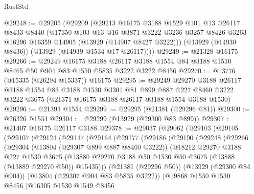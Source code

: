 \begin{lexlean}{RustStd}
\begin{coremodule}
@29248 := @29205
    (@29209
      (@29213
        @16175
        @3188
        @1529
        @101
        @13
        @26117
        @8433
        @8440
        (@17350
          @103
          @13
          @16
          @3871
          @3222
          @3236
          @3257
          @8426
          @3263
          @16296
          @16359
          @14905
          (@13929 (@14907 @8427 @3222)))
        (@13929 (@14930 @8436))
        (@13929 (@14939 @1534 @17 @26117))))
@29249 := @21328 @16175
@29266 := @29249
    @16175
    @3188
    @26117
    @3188
    @1554
    @84
    @3188
    @1530
    @8465
    @50
    @904
    @83
    @1550
    @5835
    @3222
    @3222
    @8456
@29270 := @13776 (@15335 (@26294 @15337)) @16175
@29295 := @29249
    @29270
    @3188
    @26117
    @3188
    @1554
    @83
    @3188
    @1530
    @3301
    @81
    @899
    @887
    @227
    @8460
    @3222
    @3222
    @3675
    (@21371 @16175 @3188 @26117 @3188 @1554 @3188 @1530)
@29296 := @21393 @1554
@29299 := @29295 (@21381 (@29296 @81))
@29300 := @26326 @1554
@29304 := @29299 (@13929 (@29300 @83 @899))
@29307 := @21407 @16175 @26117 @3188
@29378 := @29037
    (@29062
      (@29103
        (@29105
          (@29107
            (@29124
              (@29147
                (@29164
                  (@29177
                    (@29186
                      (@29190
                        (@29248
                          (@29266
                            (@29304
                              (@13804 (@29307 @899 @887 @8460 @3222))
                              (@18212
                                @29270
                                @3188
                                @227
                                @1530
                                @3675
                                (@13880
                                  @29270
                                  @3188
                                  @50
                                  @1530
                                  @50
                                  @3675
                                  (@13888 (@13889 @29270 @50))
                                  @15435)))
                            (@21381 (@29296 @50))
                            (@13929 (@29300 @84 @904))
                            (@13804 (@29307 @904 @83 @5835 @3222))
                            (@19868
                              @1550
                              @1530
                              @8456
                              (@16305
                                @1530
                                @1549
                                @8456

\end{coremodule}
\end{lexlean}
